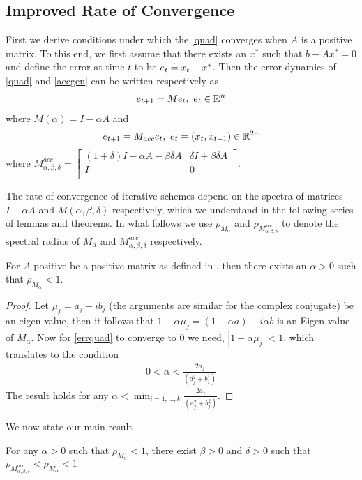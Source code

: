\subsection{Improved Rate of Convergence}
First we derive conditions under which the \eqref{quad} converges when $A$ is a positive matrix. To this end, we first assume that there exists an $x^*$ such that $b-Ax^*=0$ and define the error at time $t$ to be $e_t\stackrel{\cdot}{=} x_t-x^*$. Then the error dynamics of \eqref{quad} and \eqref{accgen} can be written respectively as
\begin{align}\label{errquad}
e_{t+1}=M e_{t}, ~e_t \in \mathbb{R}^n
\end{align}
where $M(\alpha)=I-\alpha A$
and
\begin{align}\label{erraccgen}
e_{t+1}=M_{acc} e_{t},  ~e_t =(x_t,x_{t-1}) \in \mathbb{R}^{2n}
\end{align}
where $M^{acc}_{\alpha,\beta,\delta}=\begin{bmatrix} (1+\delta)I-\alpha A-\beta\delta A & \delta I+\beta \delta A \\ I &0\\\end{bmatrix}$.\par
The rate of convergence of iterative schemes depend on the spectra of matrices $I-\alpha A$ and $M(\alpha,\beta,\delta)$ respectively, which we understand in the following series of lemmas and theorems. In what follows we use $\rho_{M_{\alpha}}$ and $\rho_{M^{acc}_{\alpha,\beta,\delta}}$ to denote the spectral radius of $M_\alpha$ and $M^{acc}_{\alpha,\beta,\delta}$ respectively.
\begin{lemma}
For $A$ positive be a positive matrix as defined in , then there exists an $\alpha>0$ such that $\rho_{M_\alpha}<1$.
\end{lemma}
\begin{proof}
Let $\mu_j=a_j+ib_j$ (the arguments are similar for the complex conjugate) be an eigen value, then it follows that $1-\alpha \mu_j=(1-\alpha a)- i\alpha b $ is an Eigen value of $M_{\alpha}$. Now for \eqref{errquad} to converge to $0$ we need, $|1-\alpha\mu_j|<1$, which translates to the condition
\begin{align}
0<\alpha<\frac{2 a_j}{(a_j^2+b_j^2)}
\end{align}
The result holds for any $\alpha<\min_{i=1,\ldots,k}\frac{2 a_j}{(a_j^2+b_j^2)}$.
\end{proof}
We now state our main result
\begin{theorem}
For any $\alpha>0$ such that $\rho_{M_{\alpha}}<1$, there exist $\beta>0$ and $\delta>0$ such that $\rho_{M^{acc}_{\alpha,\beta,\delta}}<\rho_{M_\alpha}<1$
\end{theorem}
